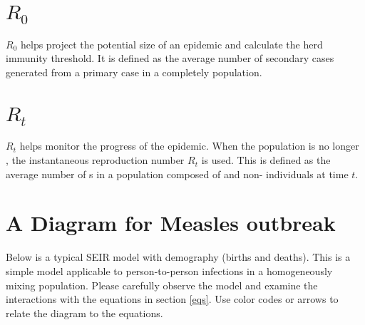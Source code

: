 \documentclass{article}
\begin{document}
\section{\( R_0 \)}
\( R_0 \) helps project the potential
size of an epidemic and calculate the herd immunity threshold.
It is defined as the average number of \underline{\hspace{2cm}} secondary cases
generated from a primary case in a completely
\underline{\hspace{3cm}} population.

\section{\( R_t \)}
\( R_t \)
helps monitor the progress of the epidemic.
When the population is no longer \underline{\hspace{2cm}}, the instantaneous
reproduction number \( R_t \) is used. This is defined as the average number
of s\underline{\hspace{2cm}} in a population composed of
\underline{\hspace{2cm}} and non-\underline{\hspace{2cm}} individuals at time \( t \).

\section{A Diagram for Measles outbreak}

Below is a typical SEIR model with demography (births and deaths). This is a simple
model applicable to person-to-person infections in a homogeneously mixing population.
Please carefully observe the model and examine the interactions with the equations
in section \ref{eqs}.  Use color codes or arrows to relate the diagram to the equations.


\begin{center}
\end{center}
\end{document}
